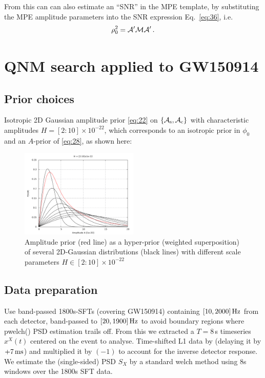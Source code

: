\documentclass[aps,prd,onecolumn,notitlepage,nofootinbib,superscriptaddress,altaffilletter,floatfix]{revtex4-1}
\begin{document}
From this can can also estimate an ``SNR'' in the MPE template, by substituting the MPE amplitude parameters into the SNR expression
Eq.~\eqref{eq:36}, i.e.\
\begin{equation}
  \label{eq:20}
  \rho_0^2 = {\mathcal A}'\mathcal{M}{\mathcal A}'\,.
\end{equation}

\section{QNM search applied to GW150914}
\label{sec:qnm-search-applied}

\subsection{Prior choices}
\label{sec:prior-choices}

Isotropic 2D Gaussian amplitude prior \eqref{eq:22} on $\{{\mathcal A}_{\mathrm{s}},{\mathcal A}_{\mathrm{c}}\}$ with characteristic amplitudes $H = [2 : 10]\times10^{-22}$, which corresponds to
an isotropic prior in $\phi_0$ and an $A$-prior of \eqref{eq:28}, as shown here:
\begin{figure}[htbp]
  \centering
  \includegraphics[width=0.5\textwidth]{prior_A.pdf}
  \caption{Amplitude prior (red line) as a hyper-prior (weighted superposition) of several 2D-Gaussian distributions (black lines) with different
    scale parameters $H\in{[2:10]}\times10^{-22}$}
  \label{fig:AmpPrior}
\end{figure}

\subsection{Data preparation}
\label{sec:data-preparation}

Use band-passed 1800s-SFTs (covering GW150914) containing $[10,2000]\,\mathrm{Hz}$ from each detector, band-passed to $[20,1900]\,\mathrm{Hz}$ to avoid boundary
regions where pwelch() PSD estimation trails off.
From this we extracted a $T=8\,$s timeseries $x^X(t)$ centered on the event to analyse.
Time-shifted L1 data by (delaying it by $+7\,\mathrm{ms}$) and multiplied it by $(-1)$ to account for the inverse detector response.
We estimate the (single-sided) PSD $S_X$ by a standard welch method using 8s windows over the 1800s SFT data.
\end{document}
